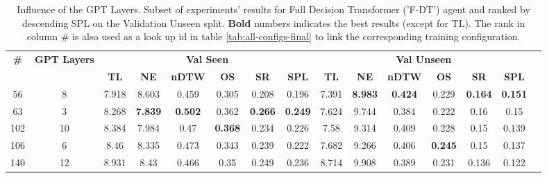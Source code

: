 \begin{table}
\centering
\caption{\label{tab:f_dt_layers}Influence of the GPT Layers. Subset of experiments' results for Full Decision Transformer ('F-DT') agent and ranked by descending SPL on the Validation Unseen split. \textbf{Bold} numbers indicates the best results (except for TL). The rank in column \# is also used as a look up id in table \ref{tab:all-configs-final} to link the corresponding training configuration.}
\begin{tabular}{@{\hskip3pt}c@{\hskip3pt}c@{\hskip3pt}c@{\hskip3pt}c@{\hskip3pt}c@{\hskip3pt}c@{\hskip3pt}c@{\hskip3pt}c@{\hskip3pt}c@{\hskip3pt}c@{\hskip3pt}c@{\hskip3pt}c@{\hskip3pt}c@{\hskip3pt}c@{\hskip3pt}c}
\toprule
                                  \textbf{\#} & \textbf{GPT Layers} & \multicolumn{6}{c}{\textbf{Val Seen}} & \multicolumn{6}{c}{\textbf{Val Unseen}} \\
\cmidrule(l){3-8}\cmidrule(l){9-14}\textbf{~} &          \textbf{~} &       \textbf{TL} &     \textbf{NE} &   \textbf{nDTW} &     \textbf{OS} &     \textbf{SR} &    \textbf{SPL} &         \textbf{TL} &     \textbf{NE} &   \textbf{nDTW} &     \textbf{OS} &     \textbf{SR} &    \textbf{SPL} \\
\midrule
                                           56 &                   8 &             7.918 &           8.603 &           0.459 &           0.305 &           0.208 &           0.196 &               7.391 &  \textbf{8.983} &  \textbf{0.424} &           0.229 &  \textbf{0.164} &  \textbf{0.151} \\
                                           63 &                   3 &             8.268 &  \textbf{7.839} &  \textbf{0.502} &           0.362 &  \textbf{0.266} &  \textbf{0.249} &               7.624 &           9.744 &           0.384 &           0.222 &            0.16 &            0.15 \\
                                          102 &                  10 &             8.384 &           7.984 &            0.47 &  \textbf{0.368} &           0.234 &           0.226 &                7.58 &           9.314 &           0.409 &           0.228 &            0.15 &           0.139 \\
                                          106 &                   6 &              8.46 &           8.335 &           0.473 &           0.343 &           0.239 &           0.222 &               7.682 &           9.266 &           0.406 &  \textbf{0.245} &            0.15 &           0.137 \\
                                          140 &                  12 &             8.931 &            8.43 &           0.466 &            0.35 &           0.249 &           0.236 &               8.714 &           9.908 &           0.389 &           0.231 &           0.136 &           0.122 \\
\bottomrule
\end{tabular}
\end{table}
